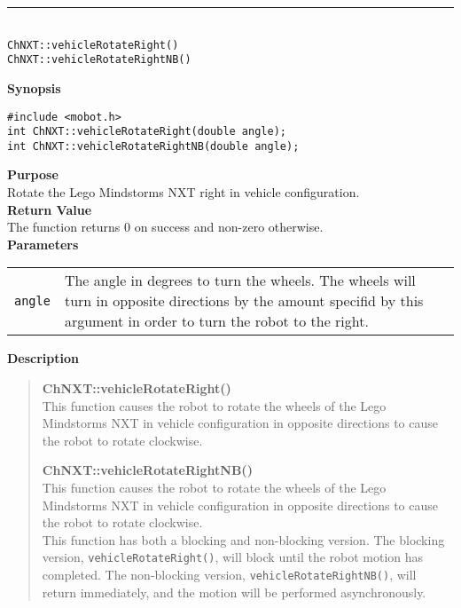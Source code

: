 \noindent
\vspace{5pt}
\rule{4.5in}{0.015in}\\
\noindent
{\LARGE \texttt{ChNXT::vehicleRotateRight()}}\\
{\LARGE \texttt{ChNXT::vehicleRotateRightNB()}}\\
{}

\noindent
{\bf Synopsis}
\begin{lstlisting}
#include <mobot.h>
int ChNXT::vehicleRotateRight(double angle);
int ChNXT::vehicleRotateRightNB(double angle);
\end{lstlisting}

\noindent
{\bf Purpose}\\
Rotate the Lego Mindstorms NXT right in vehicle configuration.\\

\noindent
{\bf Return Value}\\
The function returns 0 on success and non-zero otherwise.\\

\noindent
{\bf Parameters}\\
\vspace{-0.1in}
\begin{description}
\item               
\begin{tabular}{p{10 mm}p{145 mm}}
\texttt{angle} & The angle in degrees to turn the wheels. The wheels will turn in opposite directions by the amount specifid by this argument in order to turn the robot to the right. \\
\end{tabular}
\end{description}

\noindent
{\bf Description}\\
\vspace{-12pt}
\begin{quote}
{\bf ChNXT::vehicleRotateRight()}\\
This function causes the robot to rotate the wheels of the Lego Mindstorms NXT in vehicle configuration in opposite directions to cause the robot to rotate clockwise.

{\bf ChNXT::vehicleRotateRightNB()}\\
This function causes the robot to rotate the wheels of the Lego Mindstorms NXT in vehicle configuration in opposite directions to cause the robot to rotate clockwise.\\
\newline
This function has both a blocking and non-blocking version.
The blocking version, \texttt{vehicleRotateRight()}, will block until the
robot motion has completed. The non-blocking version, \texttt{vehicleRotateRightNB()},
will return immediately, and the motion will be performed asynchronously.\\
\end{quote}

